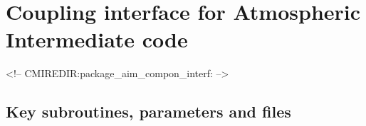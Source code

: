 \section{Coupling interface for Atmospheric Intermediate code}
\label{sec:aim_compon_interf}
\label{sec:pkg:aim_compon_interf}
\begin{rawhtml}
<!-- CMIREDIR:package_aim_compon_interf: -->
\end{rawhtml}

\subsection{Key subroutines, parameters and files}
\label{sec:pkg:aim_compon_interf:implementation_synopsis}

